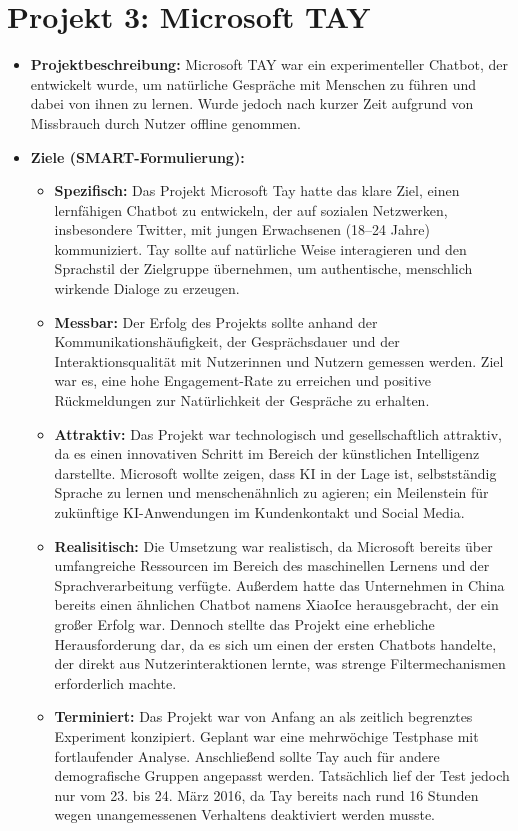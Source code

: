 \documentclass{article}
\begin{document}
\section{Projekt 3: Microsoft TAY}
\begin{itemize}
  \item \textbf{Projektbeschreibung:} 
  Microsoft TAY war ein experimenteller Chatbot, der entwickelt wurde, um
  natürliche Gespräche mit Menschen zu führen und dabei von ihnen zu lernen. Wurde jedoch nach kurzer Zeit aufgrund von Missbrauch durch Nutzer offline genommen.
  
  \item \textbf{Ziele (SMART-Formulierung):}
  \begin{itemize}
    \item \textbf{Spezifisch:} Das Projekt Microsoft Tay hatte das klare Ziel, einen lernfähigen Chatbot zu entwickeln, der auf sozialen Netzwerken, 
    insbesondere Twitter, mit jungen Erwachsenen (18–24 Jahre) kommuniziert. 
    Tay sollte auf natürliche Weise interagieren und den Sprachstil der Zielgruppe übernehmen, um authentische, menschlich wirkende Dialoge zu erzeugen.
    \item \textbf{Messbar:} Der Erfolg des Projekts sollte anhand der Kommunikationshäufigkeit, der Gesprächsdauer und
    der Interaktionsqualität mit Nutzerinnen und Nutzern gemessen werden. Ziel war es, eine hohe 
  Engagement-Rate zu erreichen und positive Rückmeldungen zur Natürlichkeit der Gespräche zu erhalten.
    \item \textbf{Attraktiv:} Das Projekt war technologisch und gesellschaftlich attraktiv, da es einen innovativen Schritt im 
    Bereich der künstlichen Intelligenz darstellte. Microsoft wollte zeigen, dass KI in der Lage ist, 
    selbstständig Sprache zu lernen und menschenähnlich zu agieren; ein Meilenstein für zukünftige KI-Anwendungen im Kundenkontakt und Social Media.
    \item \textbf{Realisitisch:} Die Umsetzung war realistisch, da Microsoft bereits über umfangreiche Ressourcen im Bereich 
    des maschinellen Lernens und der Sprachverarbeitung verfügte. Außerdem hatte das 
    Unternehmen in China bereits einen ähnlichen Chatbot namens XiaoIce herausgebracht, der ein 
    großer Erfolg war. Dennoch stellte das Projekt eine erhebliche Herausforderung dar, da es sich 
    um einen der ersten Chatbots handelte, der direkt aus Nutzerinteraktionen lernte, was strenge Filtermechanismen erforderlich machte.
    \item \textbf{Terminiert:} Das Projekt war von Anfang an als zeitlich begrenztes Experiment konzipiert. Geplant war eine 
    mehrwöchige Testphase mit fortlaufender Analyse. Anschließend sollte Tay auch für andere 
    demografische Gruppen angepasst werden. Tatsächlich lief der Test jedoch nur vom 23. bis 24. März 2016, da Tay 
    bereits nach rund 16 Stunden wegen unangemessenen Verhaltens deaktiviert werden musste.
  \end{itemize}


\end{itemize}
\end{document}
